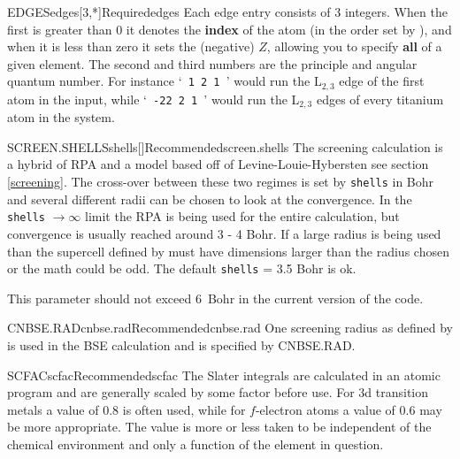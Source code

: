 \documentclass[11pt]{report}
\begin{document}

\begin{Card}{EDGES}{edges[3,*]}{Required}{edges}
Each edge entry consists of 3 integers. When the first is greater than 0 it denotes the {\bf index} of the atom (in the order set by ), and when it is less than zero it sets the (negative) $Z$, allowing you to specify {\bf all} of a given element.
The second and third numbers are the principle and angular quantum number.
For instance `\texttt{ 1 2 1 }' would run the L$_{2,3}$ edge of the first atom in the input, while `\texttt{ -22 2 1 }' would run the L$_{2,3}$ edges of every titanium atom in the system.

\end{Card}

\begin{Card}{SCREEN.SHELLS}{shells[]}{Recommended}{screen.shells}
The screening calculation is a hybrid of RPA and a model based off of Levine-Louie-Hybersten see section \ref{screening}. The cross-over between these two regimes is set by \texttt{shells} in Bohr and several different radii can be chosen to look at the convergence. In the \texttt{shells} $\rightarrow \infty$ limit the RPA is being used for the entire calculation, but convergence is usually reached around 3 - 4 Bohr. If a large radius is being used than the supercell defined by  must have dimensions larger than the radius chosen or the math could be odd. The default \texttt{shells} = 3.5 Bohr is ok.

This parameter should not exceed 6~Bohr in the current version of the code.
\end{Card}

\begin{Card}{CNBSE.RAD}{cnbse.rad}{Recommended}{cnbse.rad}
One screening radius as defined by  is used in the BSE calculation and is specified by CNBSE.RAD. 
\end{Card}

\begin{Card}{SCFAC}{scfac}{Recommended}{scfac}
The Slater integrals are calculated in an atomic program and are generally scaled by some factor before use. For 3d transition metals a value of $0.8$ is often used, while for $f$-electron atoms a value of $0.6$ may be more appropriate. The value is more or less taken to be independent of the chemical environment and only a function of the element in question.
\end{Card}
\end{document}
